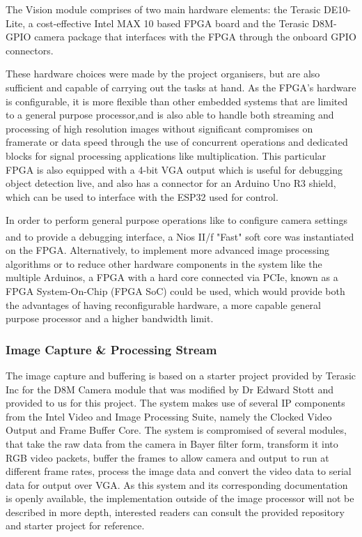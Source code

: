 \documentclass[a4paper]{article}
\begin{document}
The Vision module comprises of two main hardware elements: 
    the Terasic DE10-Lite, a cost-effective Intel MAX 10 based FPGA board 
    \cite{TerasicDE10Web} 
    and the Terasic D8M-GPIO camera package \cite{TerasicD8MWeb}
that interfaces with the FPGA through the onboard GPIO connectors. 

These hardware choices were made by the project organisers, 
but are also sufficient and capable of carrying out the tasks at hand. 
As the FPGA's hardware is configurable, 
it is more flexible than other embedded systems 
that are limited to a general purpose processor,and 
is also able to handle both streaming and processing of high resolution images
without significant compromises on framerate or data speed 
through the use of concurrent operations and dedicated blocks 
for signal processing applications like multiplication.
This particular FPGA is also equipped with a 4-bit VGA output 
which is useful for debugging object detection live, 
and also has a connector for an Arduino Uno R3 shield, \cite{TerasicDE10Web} 
which can be used to interface with the ESP32 used for control.  

In order to perform general purpose operations like
    to configure camera settings
    and to provide a debugging interface,
a Nios\textsuperscript{\textregistered} II/f "Fast" soft core was instantiated on the FPGA. 
Alternatively, to implement more advanced image processing algorithms
or to reduce other hardware components in the system like the multiple Arduinos, 
a FPGA with a hard core connected via PCIe, 
known as a FPGA System-On-Chip (FPGA SoC) \cite{FPGASoC} could be used, 
which would provide both the advantages of having reconfigurable hardware,
a more capable general purpose processor and a higher bandwidth limit. 

\subsubsection{Image Capture \& Processing Stream}

The image capture and buffering is based on a starter project provided
by Terasic Inc for the D8M Camera module that was modified by Dr Edward Stott 
\cite{EEE2Rover} and provided to us for this project. The system makes use of 
several IP components from the Intel Video and Image Processing Suite,
namely the Clocked Video Output and Frame Buffer Core. The system is compromised
of several modules, that take the raw data from the camera in Bayer filter form\cite{TerasicD8MWeb},
transform it into RGB video packets, buffer the frames to allow camera and output
to run at different frame rates, process the image data and convert the video 
data to serial data for output over VGA.\cite{EEE2Rover} As this system and its 
corresponding documentation is openly available, the implementation outside of 
the image processor will not be described in more depth, interested readers can 
consult the provided repository and starter project for reference. 
\end{document}
